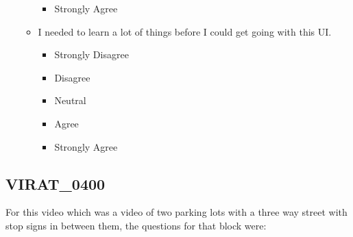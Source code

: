 \documentclass[doublespace,draft,nopageskip]{VTthesis} %
\begin{document}
\begin{itemize}
\begin{itemize}
\begin{itemize}
                \item Strongly Agree
            \end{itemize}
        \item I needed to learn a lot of things before I could get going with this UI.
            \begin{itemize}
                \item Strongly Disagree
                \item Disagree
                \item Neutral
                \item Agree
                \item Strongly Agree
            \end{itemize}
    \end{itemize}
\end{itemize}

\subsection{VIRAT_0400}

For this video which was a video of two parking lots with a three way street with stop signs in between them, the questions for that block were: 
\end{document}
